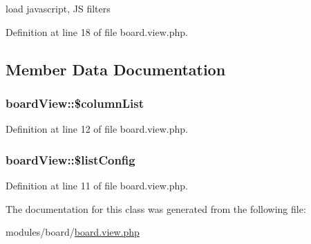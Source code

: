 load javascript, J\+S filters

Definition at line 18 of file board.\+view.\+php.



\subsection{Member Data Documentation}
\hypertarget{classboardView_a44f0d3c92b73c34329708f5fe44652cc}{
\subsubsection[{\$column\+List}]{\setlength{\rightskip}{0pt plus 5cm}board\+View\+::\$column\+List}}\label{classboardView_a44f0d3c92b73c34329708f5fe44652cc}


Definition at line 12 of file board.\+view.\+php.

\hypertarget{classboardView_a8d64b7032d159a960972ae38f76897f8}{
\subsubsection[{\$list\+Config}]{\setlength{\rightskip}{0pt plus 5cm}board\+View\+::\$list\+Config}}\label{classboardView_a8d64b7032d159a960972ae38f76897f8}


Definition at line 11 of file board.\+view.\+php.



The documentation for this class was generated from the following file\+:\begin{DoxyCompactItemize}
\item 
modules/board/\hyperlink{board_8view_8php}{board.\+view.\+php}\end{DoxyCompactItemize}
